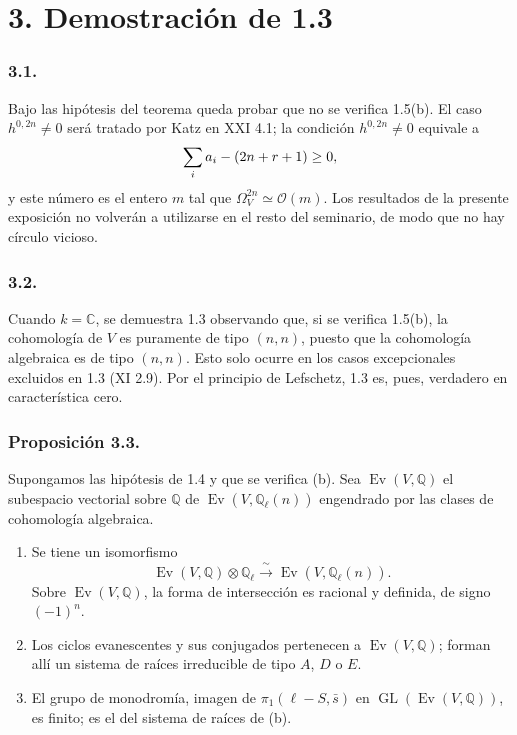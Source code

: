 \section*{3. Demostración de 1.3}

\subsubsection*{3.1.}

Bajo las hipótesis del teorema queda probar que no se verifica 1.5(b).
El caso $h^{0,2n}\ne0$ será tratado por Katz en XXI 4.1; la condición
$h^{0,2n}\ne0$ equivale a
\[
\sum_i\sisi{d_i}{a_i}-(2n+r+1)\geq0,
\]
y este número es el entero $m$ tal que
$\Omega_V^{2n}\simeq\mathcal O(m)$. Los resultados de la presente exposición
no volverán a utilizarse en el resto del seminario, de modo que no hay
círculo vicioso.

\pageoriginale

\subsubsection*{3.2.}

Cuando $k=\mathbb C$, se demuestra 1.3 observando que, si se verifica
1.5(b), la cohomología de $V$ es puramente de tipo $(n,n)$, puesto que
la cohomología algebraica es de tipo $(n,n)$. Esto solo ocurre en los
casos excepcionales excluidos en 1.3 (XI 2.9). Por el principio de
Lefschetz, 1.3 es, pues, verdadero en característica cero.

\subsubsection*{Proposición 3.3.}

Supongamos las hipótesis de 1.4 y que se verifica (b). Sea
$\operatorname{Ev}(V,\mathbb Q)$ el subespacio vectorial sobre
$\mathbb Q$ de $\operatorname{Ev}(V,\mathbb Q_\ell(n))$ engendrado por
las clases de cohomología algebraica.
\begin{enumerate}[label=(\alph*)]
\item Se tiene un isomorfismo
  \[
  \operatorname{Ev}(V,\mathbb Q)\otimes\mathbb Q_\ell
  \xrightarrow{\ \sim\ }
  \operatorname{Ev}(V,\mathbb Q_\ell(n)).
  \]
  Sobre $\operatorname{Ev}(V,\mathbb Q)$, la forma de intersección es
  racional y definida, de signo $(-1)^n$.
\item Los ciclos evanescentes y sus conjugados pertenecen a
  $\operatorname{Ev}(V,\mathbb Q)$; forman allí un sistema de raíces
  irreducible de tipo $A$, $D$ o $E$.
\item El grupo de monodromía, imagen de $\pi_1(\ell-S,\bar s)$ en
  $\operatorname{GL}(\operatorname{Ev}(V,\mathbb Q))$, es finito; es
  el  del sistema de raíces de (b).
\end{enumerate}

